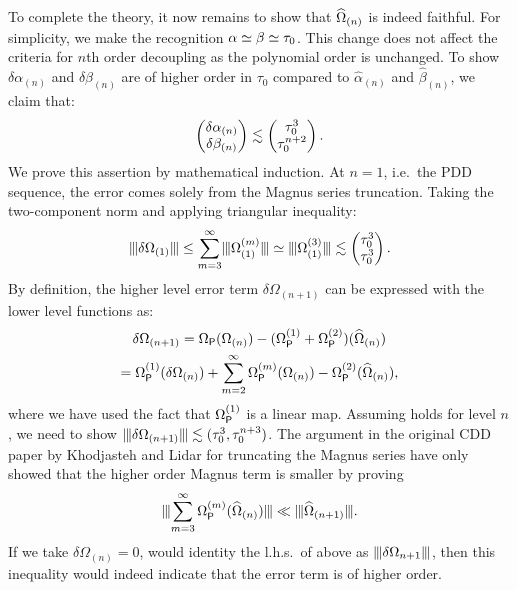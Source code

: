 \documentclass[aps,pra,reprint,superscriptaddress]{revtex4-2}
\newcommand{\Opdd}{\Omega_{\mathsf{P}}}
\begin{document}
To complete the theory, it now remains to show that $\widehat{\Omega}_{(n)}$ is indeed faithful. For simplicity, we make the recognition $\alpha\simeq\beta\simeq\tau_0$.
This change does not affect the criteria for $n$th order decoupling as the polynomial order is unchanged. To show $\delta\alpha_{(n)}$ and $\delta\beta_{(n)}$ are of higher order in $\tau_0$ compared to $\widehat\alpha_{(n)}$ and $\widehat\beta_{(n)}$, we claim that:
\begin{equation}\label{eq:cdd-error-bounds}
\begin{pmatrix}
\delta\alpha_{(n)}\\
\delta\beta_{(n)} 
\end{pmatrix}
\lesssim
\begin{pmatrix}
\tau_0^3\\
\tau_0^{n+2} 
\end{pmatrix}.
\end{equation}
We prove this assertion by mathematical induction.
At $n=1$,  i.e.\ the PDD sequence, the error comes solely from the Magnus series truncation.
Taking the two-component norm and applying triangular inequality:
\begin{equation}
\opnorm{\delta\Omega_{(1)}}\le\sum_{m=3}^\infty \opnorm{\Omega_{(1)}\up{m}}
\simeq \opnorm{\Omega_{(1)}\up{3}} \lesssim
\begin{pmatrix}
\Dt^3\\
\Dt^3
\end{pmatrix}.
\end{equation}
By definition, the higher level error term $\delta\Omega_{(n+1)}$ can be 
expressed with the lower level functions as:
\begin{multline}\label{eq:error update}
\delta\Omega_{(n+1)} 
=\Opdd(\Omega_{(n)})-(\Opdd\up{1}+\Opdd\up{2})(\Ohat_{(n)})\\
= \Opdd\up{1}(\delta\Omega_{(n)})+ \sum_{m=2}^\infty \Opdd\up{m}(\Omega_{(n)})-\Opdd\up{2}(\Ohat_{(n)}),
\end{multline} 
where we have used the fact that $\Opdd\up{1}$ is a linear map. Assuming   holds for level $n$, we need to show $\opnorm{\delta\Omega_{(n+1)}}\lesssim(\Dt^3,\Dt^{n+3})$.
The argument in the original CDD paper by Khodjasteh and Lidar for truncating the Magnus series have only showed that the higher order Magnus term is smaller by proving
\begin{equation*}
    \opnorm{ \sum_{m=3}^\infty\Opdd\up{m}(\Ohat_{(n)}) } \ll \opnorm{\Ohat_{(n+1)}}.
\end{equation*}
If we take $\delta\Omega_{(n)}=0$,  would identity the l.h.s.\  of above as $\opnorm{\delta \Omega_{n+1}}$, then this inequality would indeed indicate that the error term is of higher order.
\end{document}
